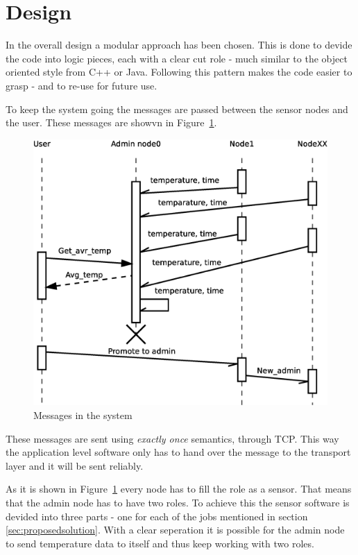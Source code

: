 \section{Design}
\label{sec:design}

In the overall design a modular approach has been chosen. This is done to devide the code into logic pieces, each with a clear cut role - much similar to the object oriented style from C++ or Java. Following this pattern makes the code easier to grasp - and to re-use for future use.


To keep the system going the messages are passed between the sensor nodes and the user. These messages are showvn in Figure~\ref{fig:messages}.
\begin{figure}[ht!]
\centering
    \includegraphics[scale=0.4]{eps/communications2}
\caption{Messages in the system}
\label{fig:messages}
\end{figure}

These messages are sent using \textit{exactly once} semantics, through TCP. This way the application level software only has to hand over the message to the transport layer and it will be sent reliably.

As it is shown in Figure~\ref{fig:messages} every node has to fill the role as a sensor. That means that the admin node has to have two roles. To achieve this the sensor software is devided into three parts - one for each of the jobs mentioned in section \ref{sec:proposedsolution}. With a clear seperation it is possible for the admin node to send temperature data to itself and thus keep working with two roles.

